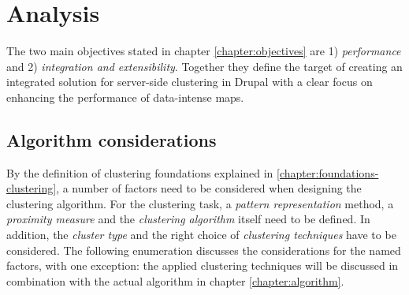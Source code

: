 
%
%

\section{Analysis}
\label{chapter:analysis}

The two main objectives stated in chapter \ref{chapter:objectives} are 1) \textit{performance} and 2) \textit{integration and extensibility}. Together they define the target of creating an integrated solution for server-side clustering in Drupal with a clear focus on enhancing the performance of data-intense maps.


\subsection{Algorithm considerations}

By the definition of clustering foundations explained in \ref{chapter:foundations-clustering}, a number of factors need to be considered when designing the clustering algorithm. For the clustering task, a \textit{pattern representation} method, a \textit{proximity measure} and the \textit{clustering algorithm} itself need to be defined. In addition, the \textit{cluster type} and the right choice of \textit{clustering techniques} have to be considered. The following enumeration discusses the considerations for the named factors, with one exception: the applied clustering techniques will be discussed in combination with the actual algorithm in chapter \ref{chapter:algorithm}. 

